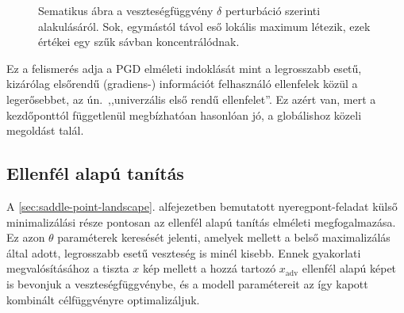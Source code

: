 \begin{figure}[htb]
\centering
{}
\caption{Sematikus ábra a veszteségfüggvény $\delta$ perturbáció szerinti alakulásáról. 
Sok, egymástól távol eső lokális maximum létezik, ezek értékei egy szűk sávban koncentrálódnak.}
\label{fig:loss-landscape-local-maxima}
\end{figure}

Ez a felismerés adja a PGD elméleti indoklását mint a legrosszabb esetű, kizárólag elsőrendű (gradiens-) információt felhasználó 
ellenfelek közül a legerősebbet, az ún.\ ,,univerzális első rendű ellenfelet''. 
Ez azért van, mert a kezdőponttól függetlenül megbízhatóan hasonlóan jó, a globálishoz közeli megoldást talál. 


\subsection{Ellenfél alapú tanítás}
A \ref{sec:saddle-point-landscape}. alfejezetben bemutatott nyeregpont-feladat külső minimalizálási része pontosan az ellenfél 
alapú tanítás elméleti megfogalmazása. 
Ez azon $\theta$ paraméterek keresését jelenti, amelyek mellett a belső maximalizálás által adott, legrosszabb esetű veszteség 
is minél kisebb. 
Ennek gyakorlati megvalósításához a tiszta $x$ kép mellett a hozzá tartozó $x_{\mathrm{adv}}$ ellenfél alapú képet is bevonjuk a 
veszteségfüggvénybe, és a modell paramétereit az így kapott kombinált célfüggvényre optimalizáljuk. 


